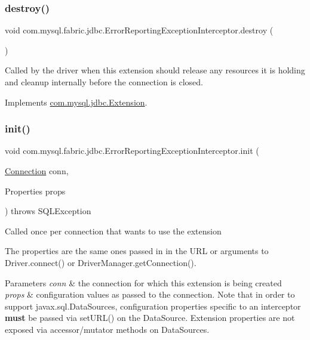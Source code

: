 \subsubsection{\texorpdfstring{destroy()}{destroy()}}
{\footnotesize\ttfamily void com.\+mysql.\+fabric.\+jdbc.\+Error\+Reporting\+Exception\+Interceptor.\+destroy (\begin{DoxyParamCaption}{ }\end{DoxyParamCaption})}

Called by the driver when this extension should release any resources it is holding and cleanup internally before the connection is closed. 

Implements \mbox{\hyperlink{interfacecom_1_1mysql_1_1jdbc_1_1_extension_a7d9644de305efed5df71f3fcc7cc1772}{com.\+mysql.\+jdbc.\+Extension}}.

\mbox{\label{classcom_1_1mysql_1_1fabric_1_1jdbc_1_1_error_reporting_exception_interceptor_a8c67e1a183a6c155dd67287d43c623fb}} 
\subsubsection{\texorpdfstring{init()}{init()}}
{\footnotesize\ttfamily void com.\+mysql.\+fabric.\+jdbc.\+Error\+Reporting\+Exception\+Interceptor.\+init (\begin{DoxyParamCaption}\item[{\mbox{\hyperlink{interfacecom_1_1mysql_1_1jdbc_1_1_connection}{Connection}}}]{conn,  }\item[{Properties}]{props }\end{DoxyParamCaption}) throws S\+Q\+L\+Exception}

Called once per connection that wants to use the extension

The properties are the same ones passed in in the U\+RL or arguments to Driver.\+connect() or Driver\+Manager.\+get\+Connection().


\begin{DoxyParams}{Parameters}
{\em conn} & the connection for which this extension is being created \\
\hline
{\em props} & configuration values as passed to the connection. Note that in order to support javax.\+sql.\+Data\+Sources, configuration properties specific to an interceptor {\bfseries must} be passed via set\+U\+R\+L() on the Data\+Source. Extension properties are not exposed via accessor/mutator methods on Data\+Sources.\\
\hline
\end{DoxyParams}

